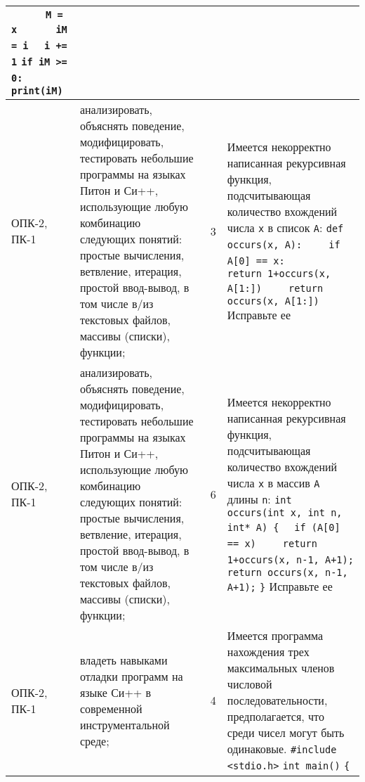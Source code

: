 \documentclass[a4paper,12pt]{article}
\begin{document}
\begin{longtable}{|p{15mm}|p{42mm}|p{17mm}|p{70mm}|}
\verb!      M = x!\newline
\verb!      iM = i!\newline
\verb!  i += 1!\newline
\verb!if iM >= 0:!\newline
\verb!  print(iM) ! 
\\
\hline
ОПК-2, ПК-1 & 
анализировать, объяснять поведение, модифицировать, тестировать небольшие программы на языках Питон и Си++, использующие любую комбинацию следующих понятий: простые вычисления, ветвление, итерация, простой ввод-вывод, в том числе в/из текстовых файлов, массивы (списки), функции; & 
3 & 
Имеется некорректно написанная рекурсивная функция, подсчитывающая количество вхождений числа {\tt x} в список {\tt A}:\newline
\verb!def occurs(x, A):!\newline
\verb!    if A[0] == x:!\newline
\verb!        return 1+occurs(x, A[1:])!\newline
\verb!    return occurs(x, A[1:])!\newline
Исправьте ее 
\\
\hline
ОПК-2, ПК-1 & 
анализировать, объяснять поведение, модифицировать, тестировать небольшие программы на языках Питон и Си++, использующие любую комбинацию следующих понятий: простые вычисления, ветвление, итерация, простой ввод-вывод, в том числе в/из текстовых файлов, массивы (списки), функции; & 
6 & 
Имеется некорректно написанная рекурсивная функция, подсчитывающая количество вхождений числа {\tt x} в массив {\tt A} длины {\tt n}:\newline
\verb!int occurs(int x, int n, int* A) {!\newline
\verb!  if (A[0] == x)!\newline
\verb!    return 1+occurs(x, n-1, A+1);!\newline
\verb!  return occurs(x, n-1, A+1);!\newline
\verb!}!\newline
Исправьте ее 
\\
\hline
ОПК-2, ПК-1 & 
владеть навыками отладки программ на языке Си++ в современной инструментальной среде; & 
4 & 
Имеется программа нахождения трех максимальных членов числовой последовательности,
предполагается, что среди чисел могут быть одинаковые. \newline
\verb!#include <stdio.h>!\newline
\verb!int main()!\newline
\verb!{!\newline

\end{longtable}
\end{document}
